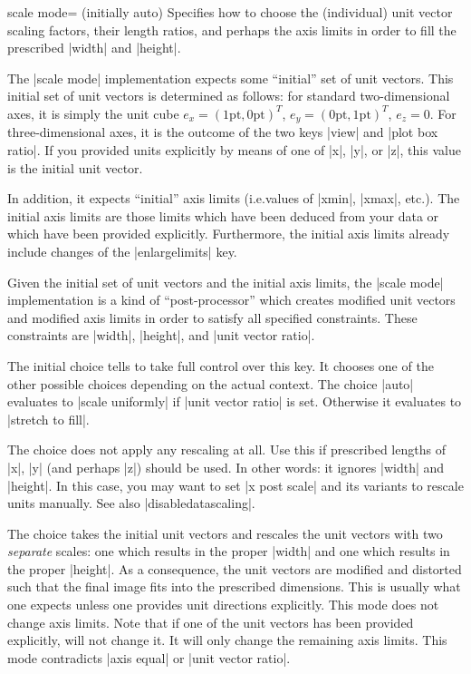 \begin{pgfplotskey}{scale mode= (initially auto)}
    Specifies how to choose the (individual) unit vector scaling factors, their
    length ratios, and perhaps the axis limits in order to fill the prescribed
    |width| and |height|.

    The |scale mode| implementation expects some ``initial'' set of unit
    vectors. This initial set of unit vectors is determined as follows: for
    standard two-dimensional axes, it is simply the unit cube
    $e_x=(1\text{pt},0\text{pt})^T$, $e_y=(0\text{pt},1\text{pt})^T$, $e_z=0$.
    For three-dimensional axes, it is the outcome of the two keys |view| and
    |plot box ratio|. If you provided units explicitly by means of one of |x|,
    |y|, or |z|, this value is the initial unit vector.

    In addition, it expects ``initial'' axis limits (i.e.\@ values of |xmin|,
    |xmax|, etc.). The initial axis limits are those limits which have been
    deduced from your data or which have been provided explicitly. Furthermore,
    the initial axis limits already include changes of the |enlargelimits| key.

    Given the initial set of unit vectors and the initial axis limits, the
    |scale mode| implementation is a kind of ``post-processor'' which creates
    modified unit vectors and modified axis limits in order to satisfy all
    specified constraints. These constraints are |width|, |height|, and
    |unit vector ratio|.

    The initial choice  tells \PGFPlots{} to take full
    control over this key. It chooses one of the other possible choices
    depending on the actual context. The choice |auto| evaluates to
    |scale uniformly| if |unit vector ratio| is set. Otherwise it evaluates to
    |stretch to fill|.

    The choice  does not apply any rescaling at all. Use this
    if prescribed lengths of |x|, |y| (and perhaps |z|) should be used. In
    other words: it ignores |width| and |height|. In this case, you may want to
    set |x post scale| and its variants to rescale units manually. See also
    |disabledatascaling|.

    The choice  takes the initial unit vectors and
    rescales the unit vectors with two \emph{separate} scales: one which
    results in the proper |width| and one which results in the proper |height|.
    As a consequence, the unit vectors are modified and distorted such that the
    final image fits into the prescribed dimensions. This is usually what one
    expects unless one provides unit directions explicitly. This mode does not
    change axis limits. Note that if one of the unit vectors has been provided
    explicitly, \PGFPlots{} will not change it. It will only change the
    remaining axis limits. This mode contradicts |axis equal| or
    |unit vector ratio|.


\end{pgfplotskey}
